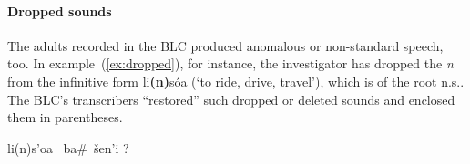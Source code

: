 

\paragraph{Dropped sounds}
The adults recorded in the BLC produced anomalous or non-standard speech, too. In example~(\ref{ex:dropped}), for instance, the investigator 
has dropped the 
\emph{n} from the infinitive form 
\textsf{li\textbf{(n)}s\'oa} (`to ride, drive, travel'), 
which is of the root n.s.. 
The BLC's transcribers ``restored'' such dropped or deleted sounds and enclosed them in parentheses.
\begin{exe} 
\ex \label{ex:dropped} \textsf{li(n)s\a'{o}a \, ba\#\, \v{s}en\a'{i} ?}
\end{exe}



